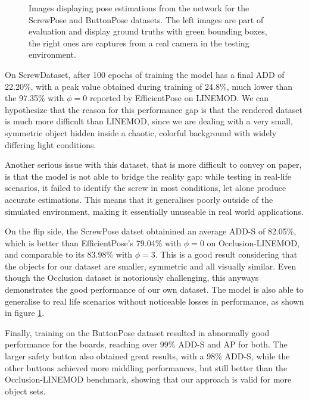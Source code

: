 \begin{figure}[htp]


    \caption{Images displaying pose estimations from the network for the ScrewPose and ButtonPose datasets. The left images are part of evaluation and display ground truths with green bounding boxes, the right ones are captures from a real camera in the testing environment.}
    \label{fig:inferencing}
\end{figure}

On ScrewDataset, after 100 epochs of training the model has a final ADD of 22.20\%, with a peak value obtained during training of 24.8\%, much lower than the 97.35\% with $\phi=0$ reported by EfficientPose on LINEMOD. We can hypothesize that the reason for this performance gap is that the rendered dataset is much more difficult than LINEMOD, since we are dealing with a very small, symmetric object hidden inside a chaotic, colorful background with widely differing light conditions.

Another serious issue with this dataset, that is more difficult to convey on paper, is that the model is not able to bridge the reality gap: while testing in real-life scenarios, it failed to identify the screw in most conditions, let alone produce accurate estimations. This means that it generalises poorly outside of the simulated environment, making it essentially unuseable in real world applications.

On the flip side, the ScrewPose datset obtainined an average ADD-S of 82.05\%, which is better than EfficientPose's 79.04\% with $\phi=0$ on Occlusion-LINEMOD, and comparable to its 83.98\% with $\phi = 3$. This is a good result considering that the objects for our dataset are smaller, symmetric and all visually similar. Even though the Occlusion dataset is notoriously challenging, this anyways demonstrates the good performance of our own dataset. The model is also able to generalise to real life scenarios without noticeable losses in performance, as shown in figure \ref*{fig:inferencing}.

Finally, training on the ButtonPose dataset resulted in abnormally good performance for the boards, reaching over 99\% ADD-S and AP for both. The larger safety button also obtained great results, with a 98\% ADD-S, while the other buttons achieved more middling performances, but still better than the Occlusion-LINEMOD benchmark, showing that our approach is valid for more object sets.

